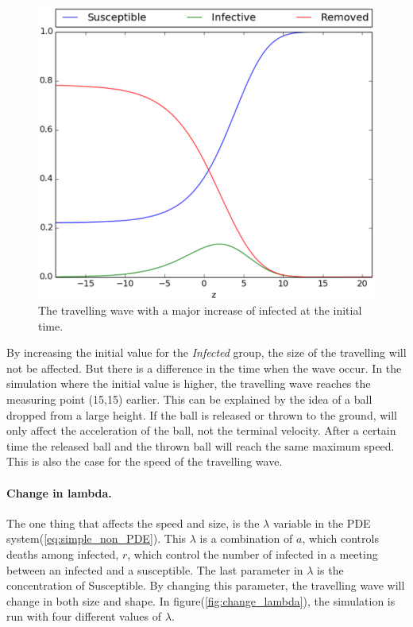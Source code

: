 \documentclass[%
twoside,                 %
final,                   %
10pt]{article}
\begin{document}
\begin{figure}[ht]
  \centerline{\includegraphics[width=0.8\linewidth]{plots/TW_2D_initial_z_lambda_0_5.eps}}
  \caption{
  \label{fig:initial_trav_wave} The travelling wave with a major increase of infected at the initial time.
  }
\end{figure}


By increasing the initial value for the \emph{Infected} group, the size of the travelling will not be affected. But there is a difference in the time when the wave occur. In the simulation where the initial value is higher, the travelling wave reaches the measuring point (15,15) earlier. This can be explained by the idea of a ball dropped from a large height. If the ball is released or thrown to the ground, will only affect the acceleration of the ball, not the terminal velocity. After a certain time the released ball and the thrown ball will reach the same maximum speed. This is also the case for the speed of the travelling wave. 
\paragraph{Change in lambda.}
The one thing that affects the speed and size, is the $\lambda$ variable in the PDE system(\ref{eq:simple_non_PDE}). This $\lambda$ is a combination of $a$, which controls deaths among infected, $r$, which control the number of infected in a meeting between an infected and a susceptible. The last parameter in $\lambda$ is the concentration of Susceptible. By changing this parameter, the travelling wave will change in both size and shape. In figure(\ref{fig:change_lambda}), the simulation is run with four different values of $\lambda$.
\end{document}
